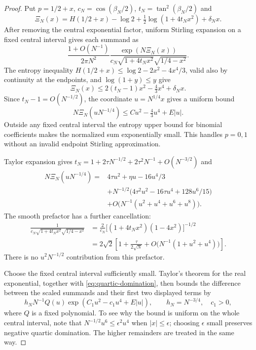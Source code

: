 \documentclass[11pt,a4paper]{article}
\numberwithin{equation}{section}
\theoremstyle{definition}
\theoremstyle{remark}
\begin{document}
\begin{proof}
Put $p=1/2+x$, $c_N=\cos(\beta_N/2)$,
$t_N=\tan^2(\beta_N/2)$ and
\[
 \Xi_N(x)=H(1/2+x)-\log2+\tfrac12\log(1+4t_Nx^2)+\delta_Nx.
\]
After removing the central exponential factor, uniform Stirling
expansion on a fixed central interval gives each summand as
\begin{equation}\label{eq:crossover-summand}
 \frac{1+O(N^{-1})}{2\pi N^2}
 \frac{\exp(N\Xi_N(x))}
 {c_N\sqrt{1+4t_Nx^2}\sqrt{1/4-x^2}}.
\end{equation}
The entropy inequality
$H(1/2+x)\le\log2-2x^2-4x^4/3$, valid also by continuity at the
endpoints, and $\log(1+y)\le y$ give
\[
 \Xi_N(x)\le2(t_N-1)x^2-\tfrac43x^4+\delta_Nx.
\]
Since $t_N-1=O(N^{-1/2})$, the coordinate $u=N^{1/4}x$ gives a
uniform bound
\begin{equation}\label{eq:quartic-domination}
 N\Xi_N(uN^{-1/4})\le C u^2-\tfrac43u^4+E|u|.
\end{equation}
Outside any fixed central interval the entropy upper bound for
binomial coefficients makes the normalized sum exponentially small.
This handles $p=0,1$ without an invalid endpoint Stirling approximation.

Taylor expansion gives
$t_N=1+2\tau N^{-1/2}+2\tau^2N^{-1}+O(N^{-3/2})$ and
\begin{align*}
 N\Xi_N(uN^{-1/4})
 ={}&4\tau u^2+\eta u-16u^4/3\\
 &+N^{-1/2}\bigl(4\tau^2u^2-16\tau u^4+128u^6/15\bigr)\\
 &+O\bigl(N^{-1}(u^2+u^4+u^6+u^8)\bigr).
\end{align*}
The smooth prefactor has a further cancellation:
\begin{align*}
 \frac{1}{c_N\sqrt{1+4t_Nx^2}\sqrt{1/4-x^2}}
 &=\frac{2}{c_N}\bigl[(1+4t_Nx^2)(1-4x^2)\bigr]^{-1/2}\\
 &=2\sqrt2\left[1+\frac{\tau}{2\sqrt N}
 +O\bigl(N^{-1}(1+u^2+u^4)\bigr)\right].
\end{align*}
There is no $u^2N^{-1/2}$ contribution from this prefactor.

Choose the fixed central interval sufficiently small. Taylor's theorem
for the real exponential, together with \eqref{eq:quartic-domination},
then bounds the difference between the scaled summands and their first
two displayed terms by
\[
 h_N N^{-1}Q(u)\exp(C_1u^2-c_1u^4+E|u|),
 \qquad h_N=N^{-3/4},\quad c_1>0,
\]
where $Q$ is a fixed polynomial. To see why the bound is uniform on
the whole central interval, note that $N^{-1/2}u^6\le\epsilon^2u^4$
when $|x|\le\epsilon$; choosing $\epsilon$ small preserves negative
quartic domination. The higher remainders are treated in the same way.


\end{proof}
\end{document}
